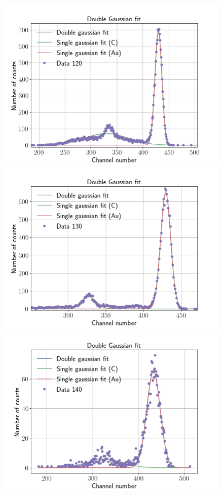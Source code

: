 \begin{figure}
    \centering
\includegraphics[width=0.99\columnwidth]{Data_120}
\includegraphics[width=0.99\columnwidth]{Data_130}
\includegraphics[width=0.99\columnwidth]{Data_140}

\end{figure}
